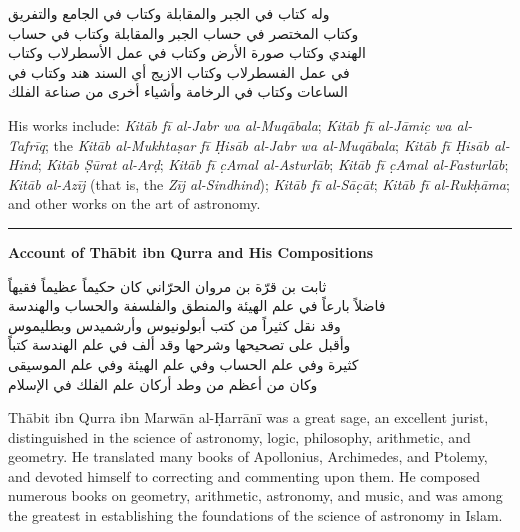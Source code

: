 \documentclass[11pt,a4paper]{article}
\newcommand{\longline}{\noindent\rule{\textwidth}{0.4pt}}
\newcommand{\ar}[1]{{\arabicfont\beginR #1\endR}}
\newcommand{\bilingual}[2]{%
  \noindent
  \begin{minipage}[t]{0.47\textwidth}
    \vspace{0pt}
    \begin{flushright}
    {\arabicfont\beginR #1\endR}
    \end{flushright}
  \end{minipage}%
  \hfill\vline\hfill
  \begin{minipage}[t]{0.47\textwidth}
    \vspace{0pt}
    #2
  \end{minipage}%
  \par\vspace{0.8em}
}
\newcommand{\bilingualsubsection}[2]{%
  \vspace{0.6em}%
  \noindent
  \begin{minipage}[t]{0.47\textwidth}
    \begin{flushright}
    \textbf{\color{sectioncolor}\ar{#1}}
    \end{flushright}
  \end{minipage}%
  \hfill
  \begin{minipage}[t]{0.47\textwidth}
    \textbf{\color{sectioncolor}#2}
  \end{minipage}%
  \par\vspace{0.4em}%
}
\begin{document}
\vspace{0.5em}
\bilingual
{وله كتاب في الجبر والمقابلة وكتاب في الجامع والتفريق\\
وكتاب المختصر في حساب الجبر والمقابلة وكتاب في حساب\\
الهندي وكتاب صورة الأرض وكتاب في عمل الأسطرلاب وكتاب\\
في عمل الفسطرلاب وكتاب الازيج أي السند هند وكتاب في\\
الساعات وكتاب في الرخامة وأشياء أخرى من صناعة الفلك}
{His works include: \textit{Kit\=ab f\=i al-Jabr wa al-Muq\=abala};
\textit{Kit\=ab f\=i al-J\=ami\d{c} wa al-Tafr\=iq}; the
\textit{Kit\=ab al-Mukhta\d{s}ar f\=i \d{H}is\=ab al-Jabr
wa al-Muq\=abala}; \textit{Kit\=ab f\=i \d{H}is\=ab al-Hind};
\textit{Kit\=ab \d{S}\=urat al-Ar\d{d}}; \textit{Kit\=ab f\=i \d{c}Amal
al-Asturl\=ab}; \textit{Kit\=ab f\=i \d{c}Amal al-Fasturl\=ab};
\textit{Kit\=ab al-Az\=ij} (that is, the \textit{Z\=ij al-Sindhind});
\textit{Kit\=ab f\=i al-S\=a\d{c}\=at}; \textit{Kit\=ab f\=i
al-Ruk\d{h}\=ama}; and other works on the art of astronomy.}

\vspace{1em}
\longline
\vspace{0.5em}

\bilingualsubsection{ذكر ثابت بن قرّة ومصنفاته}{Account of Th\=abit ibn Qurra and His Compositions}

\vspace{0.5em}
\bilingual
{ثابت بن قرّة بن مروان الحرّاني كان حكيماً عظيماً فقيهاً\\
فاضلاً بارعاً في علم الهيئة والمنطق والفلسفة والحساب والهندسة\\
وقد نقل كثيراً من كتب أبولونيوس وأرشميدس وبطليموس\\
وأقبل على تصحيحها وشرحها وقد ألف في علم الهندسة كتباً\\
كثيرة وفي علم الحساب وفي علم الهيئة وفي علم الموسيقى\\
وكان من أعظم من وطد أركان علم الفلك في الإسلام}
{Th\=abit ibn Qurra ibn Marw\=an al-\d{H}arr\=an\=i was a great sage,
an excellent jurist, distinguished in the science of astronomy, logic,
philosophy, arithmetic, and geometry. He translated many books of
Apollonius, Archimedes, and Ptolemy, and devoted himself to correcting
and commenting upon them. He composed numerous books on geometry,
arithmetic, astronomy, and music, and was among the greatest in
establishing the foundations of the science of astronomy in Islam.}
\end{document}
